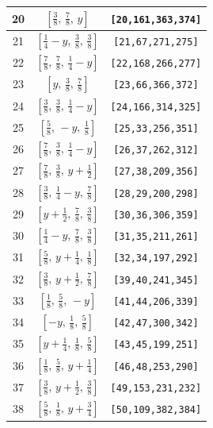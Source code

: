 \documentclass[fleqn,8pt]{jsarticle}
\begin{document}
\begin{longtable}{ccc}
20 & $\left[ \frac{3}{8},\, \frac{7}{8},\, y \right]$ & {\tt [20,161,363,374]} \\ \hline
21 & $\left[ \frac{1}{4} - y,\, \frac{3}{8},\, \frac{3}{8} \right]$ & {\tt [21,67,271,275]} \\ \hline
22 & $\left[ \frac{7}{8},\, \frac{7}{8},\, \frac{1}{4} - y \right]$ & {\tt [22,168,266,277]} \\ \hline
23 & $\left[ y,\, \frac{3}{8},\, \frac{7}{8} \right]$ & {\tt [23,66,366,372]} \\ \hline
24 & $\left[ \frac{3}{8},\, \frac{3}{8},\, \frac{1}{4} - y \right]$ & {\tt [24,166,314,325]} \\ \hline
25 & $\left[ \frac{5}{8},\, - y,\, \frac{1}{8} \right]$ & {\tt [25,33,256,351]} \\ \hline
26 & $\left[ \frac{7}{8},\, \frac{3}{8},\, \frac{1}{4} - y \right]$ & {\tt [26,37,262,312]} \\ \hline
27 & $\left[ \frac{7}{8},\, \frac{3}{8},\, y + \frac{1}{2} \right]$ & {\tt [27,38,209,356]} \\ \hline
28 & $\left[ \frac{3}{8},\, \frac{1}{4} - y,\, \frac{7}{8} \right]$ & {\tt [28,29,200,298]} \\ \hline
29 & $\left[ y + \frac{1}{2},\, \frac{7}{8},\, \frac{3}{8} \right]$ & {\tt [30,36,306,359]} \\ \hline
30 & $\left[ \frac{1}{4} - y,\, \frac{7}{8},\, \frac{3}{8} \right]$ & {\tt [31,35,211,261]} \\ \hline
31 & $\left[ \frac{5}{8},\, y + \frac{1}{4},\, \frac{1}{8} \right]$ & {\tt [32,34,197,292]} \\ \hline
32 & $\left[ \frac{3}{8},\, y + \frac{1}{2},\, \frac{7}{8} \right]$ & {\tt [39,40,241,345]} \\ \hline
33 & $\left[ \frac{1}{8},\, \frac{5}{8},\, - y \right]$ & {\tt [41,44,206,339]} \\ \hline
34 & $\left[ - y,\, \frac{1}{8},\, \frac{5}{8} \right]$ & {\tt [42,47,300,342]} \\ \hline
35 & $\left[ y + \frac{1}{4},\, \frac{1}{8},\, \frac{5}{8} \right]$ & {\tt [43,45,199,251]} \\ \hline
36 & $\left[ \frac{1}{8},\, \frac{5}{8},\, y + \frac{1}{4} \right]$ & {\tt [46,48,253,290]} \\ \hline
37 & $\left[ \frac{3}{8},\, y + \frac{1}{2},\, \frac{3}{8} \right]$ & {\tt [49,153,231,232]} \\ \hline
38 & $\left[ \frac{5}{8},\, \frac{1}{8},\, y + \frac{3}{4} \right]$ & {\tt [50,109,382,384]} \\ \hline

\end{longtable}
\end{document}
